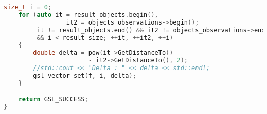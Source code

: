 \begin{lstlisting}[language=C++, basicstyle=\fontsize{10}{9}\ttfamily,
	caption={Добавление случайной велечины к измеренной},label={lst:RandomizeValue}]
    size_t i = 0;
    for (auto it = result_objects.begin(),
                 it2 = objects_observations->begin();
         it != result_objects.end() && it2 != objects_observations->end()
         && i < result_size; ++it, ++it2, ++i)
    {
        double delta = pow(it->GetDistanceTo()
                       - it2->GetDistanceTo(), 2);
        //std::cout << "Delta : " << delta << std::endl;
        gsl_vector_set(f, i, delta);
    }

    return GSL_SUCCESS;
}
\end{lstlisting}